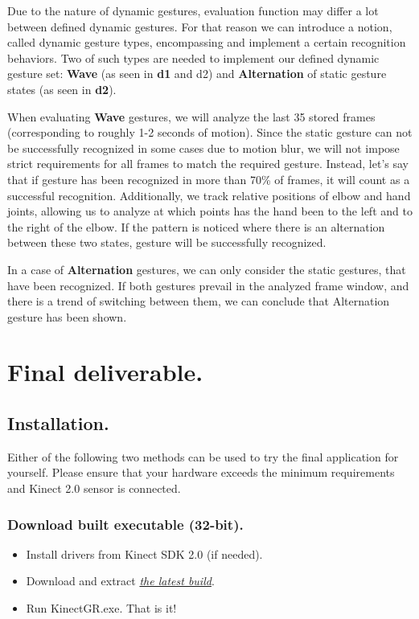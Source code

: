 \documentclass[a4paper,11pt,oneside]{article}
\begin{document}
Due to the nature of dynamic gestures, evaluation function may differ a lot between defined dynamic gestures. For that reason we can introduce a notion, called dynamic gesture types, encompassing and implement a certain recognition behaviors. Two of such types are needed to implement our defined dynamic gesture set: \textbf{Wave} (as seen in \textbf{d1} and {d2}) and \textbf{Alternation} of static gesture states (as seen in \textbf{d2}). 

When evaluating \textbf{Wave} gestures, we will analyze the last 35 stored frames (corresponding to roughly 1-2 seconds of motion). Since the static gesture can not be successfully recognized in some cases due to motion blur, we will not impose strict requirements for all frames to match the required gesture. Instead, let's say that if gesture has been recognized in more than 70\% of frames, it will count as a successful recognition. Additionally, we track relative positions of elbow and hand joints, allowing us to analyze at which points has the hand been to the left and to the right of the elbow. If the pattern is noticed where there is an alternation between these two states, gesture will be successfully recognized.

In a case of \textbf{Alternation} gestures, we can only consider the static gestures, that have been recognized. If both gestures prevail in the analyzed frame window, and there is a trend of switching between them, we can conclude that Alternation gesture has been shown.

\section{Final deliverable.}

\subsection{Installation.}

Either of the following two methods can be used to try the final application for yourself. Please ensure that your hardware exceeds the minimum requirements and Kinect 2.0 sensor is connected.

\subsubsection{Download built executable (32-bit).}

\begin{itemize}
\item Install drivers from Kinect SDK 2.0 (if needed).
\item Download and extract \href{https://github.com/dmitryfd/KinectGR/releases/download/v1.0-demo/KinectGR_v1.0.zip}{\textit{the latest build}}.
\item Run KinectGR.exe. That is it!
\end{itemize}
\end{document}
